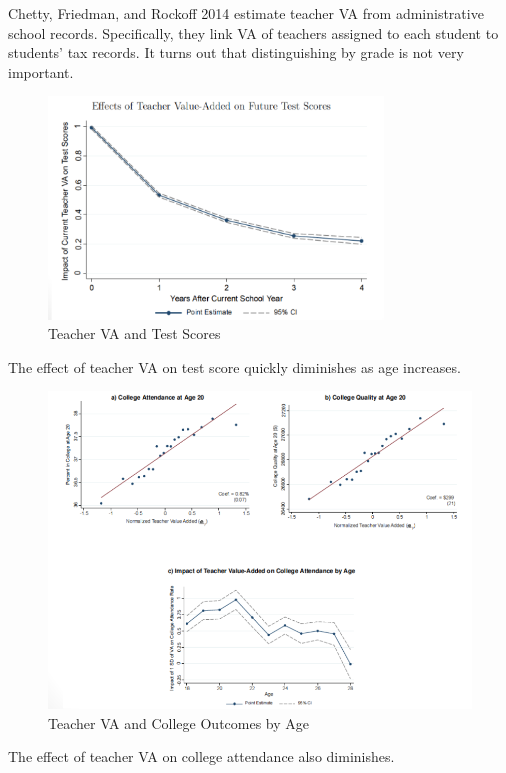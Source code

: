             Chetty, Friedman, and Rockoff 2014 estimate teacher VA from administrative school records. Specifically, they link VA of teachers assigned to each student to students' tax records. It turns out that distinguishing by grade is not very important.
            \begin{figure}[H]
                \centering
                \includegraphics[width=3.5in]{images/ch9/9 chetty 2014 4.png}
                \caption{Teacher VA and Test Scores}
            \end{figure}
            The effect of teacher VA on test score quickly diminishes as age increases.
            \begin{figure}[H]
                \centering
                \includegraphics[width=4.5in]{images/ch9/9 chetty 2014 1.png}
                \caption{Teacher VA and College Outcomes by Age}
            \end{figure}
            The effect of teacher VA on college attendance also diminishes.
